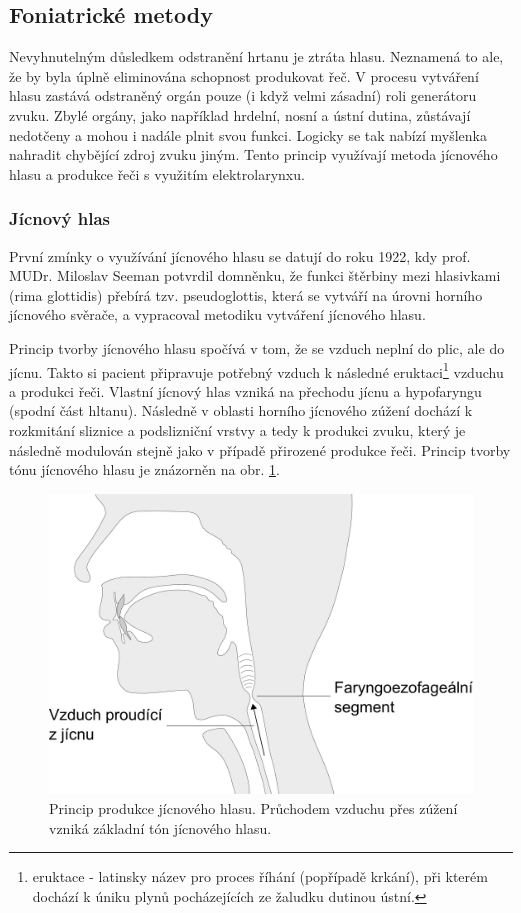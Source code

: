 \subsection{Foniatrické metody} %
\label{chap:cause:treatment:foniatric}

Nevyhnutelným důsledkem odstranění hrtanu je ztráta hlasu. Neznamená to ale, že by byla
úplně eliminována schopnost produkovat řeč. V procesu vytváření hlasu zastává
odstraněný orgán pouze (i když velmi zásadní) roli generátoru zvuku. Zbylé
orgány, jako například hrdelní, nosní a ústní dutina, zůstávají nedotčeny a mohou i
nadále plnit svou funkci. Logicky se tak nabízí myšlenka nahradit chybějící
zdroj zvuku jiným. Tento princip využívají metoda jícnového hlasu a produkce řeči s využitím 
elektrolarynxu.

\subsubsection{Jícnový hlas} %
\label{chap:cause:treatment:foniatric:esophageal}

První zmínky o využívání jícnového hlasu se datují do roku 1922, kdy prof. MUDr. Miloslav Seeman
\cite{seeman1922speech} potvrdil domněnku, že funkci štěrbiny mezi hlasivkami (rima
glottidis) přebírá tzv. pseudoglottis, která se vytváří na úrovni horního
jícnového svěrače, a vypracoval metodiku vytváření jícnového
hlasu. 

Princip tvorby jícnového hlasu spočívá v tom, že se vzduch neplní do plic, ale do jícnu. 
Takto si pacient připravuje potřebný vzduch k následné
eruktaci\footnote{eruktace - latinsky název pro proces říhání (popřípadě
krkání), při kterém dochází k úniku plynů pocházejících ze žaludku dutinou
ústní.} vzduchu a produkci řeči. Vlastní jícnový hlas vzniká na přechodu
jícnu a hypofaryngu (spodní část hltanu). Následně v oblasti horního jícnového
zúžení dochází k rozkmitání sliznice a podslizniční vrstvy a tedy k produkci zvuku,
který je následně modulován stejně jako v případě přirozené produkce řeči. 
Princip tvorby  tónu jícnového hlasu je znázorněn na obr.
\ref{fig:cause:treatment:esophageal}.

\begin{figure}[htb]
  \begin{center}
    \includegraphics[width=0.6\linewidth]{ch3-cause/figures/esophageal}
    \caption[Princip produkce jícnového hlasu.]{Princip produkce jícnového hlasu. Průchodem vzduchu přes zúžení vzniká základní tón jícnového hlasu.}
    \label{fig:cause:treatment:esophageal}
  \end{center}
\end{figure}

